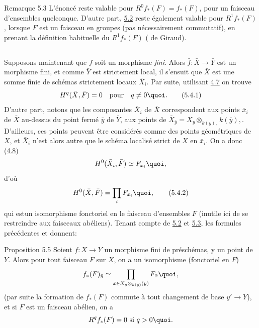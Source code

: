 \documentclass[10pt]{../fichiers-configuration-latex/smfart}
\begin{document}
\begin{enonce*}[remark]{Remarque 5.3}
L'énoncé reste valable pour $R^{0} f_{\ast} (F) = f_{\ast} (F)$, pour
un faisceau d'ensembles quelconque. D'autre part, \hyperref[VIII.thm5.2]{5.2} reste également
valable pour $R^{1} f_{\ast} (F)$, lorsque $F$ est un faisceau en
groupes (pas nécessairement commutatif), en prenant la définition
habituelle du $R^1 f_{\ast} (F)$ (\cf {} de Giraud).
\end{enonce*}

\setcounter{subsection}{3}
\subsection{}

Supposons maintenant que $f$ soit un morphisme \emph{fini}. Alors
$\bar{f} : \bar{X} \to \bar{Y}$ est un morphisme fini, et comme
$\bar{Y}$ est strictement local, il s'ensuit que $\bar{X}$ est une
somme finie de schémas strictement locaux $\bar{X}_i$. Par suite,
utilisant \hyperref[VIII.cor4.7]{4.7} on trouve
\begin{equation*}
H^q (\bar{X}, \bar{F}) = 0\quad \mbox{pour}\quad q \neq 0{\quoi}.\tag{5.4.1}
\end{equation*}
D'autre part, notons que les composantes $\bar{X}_i$ de $\bar{X}$
correspondent aux points $\bar{x}_i$ de $\bar{X}$ au-dessus du point
fermé $\bar{y}$ de $\bar{Y}$, \ie aux points de $\bar{X}_{\bar{y}} =
X_{y} \otimes_{k(y),} k(\bar{y}),$. D'ailleurs, ces points peuvent
être considérés comme des points géométriques de $X$, et $\bar{X}_i$
n'est alors autre que le schéma localisé strict de $X$ en
$\bar{x}_i$. On a donc (\hyperref[VIII.cor4.8]{4.8})
$$
H^0 (\bar{X}_i, \bar{F}) \simeq F_{\bar{x}_i}{\quoi},
$$
d'où
\begin{equation*}
H^0 (\bar{X}, \bar{F}) = \mathop{\prod}_i F_{\bar{x}_i}{\quoi},\tag{5.4.2}
\end{equation*}
qui est\pageoriginale un isomorphisme fonctoriel en le faisceau d'ensembles $F$
(inutile ici de se restreindre aux faisceaux abéliens). Tenant compte
de \hyperref[VIII.thm5.2]{5.2} et \hyperref[VIII.rem5.3]{5.3}, les formules précédentes  et  donnent:

\begin{enonce*}{Proposition 5.5}
Soient $f : X \to Y$ un morphisme fini de préschémas, y un point de
$Y$. Alors pour tout faisceau $F$ sur $X$, on a un isomorphisme
(fonctoriel en $F$)
$$
f_{\ast} (F)_{\bar{y}} \simeq \prod_{\bar{x} \in X_{y}\otimes_{k(y)}
(\bar{y})} F_{\bar{x}}{\quoi},
$$
(par suite la formation de $f_{\ast} (F)$ commute à tout changement de
base $y'\to Y$), et si $F$ est un faisceau abélien, on a
$$
R^q f_{\ast} (F) = 0 \mbox{ si } q > 0{\quoi}.
$$
\end{enonce*}
\end{document}
